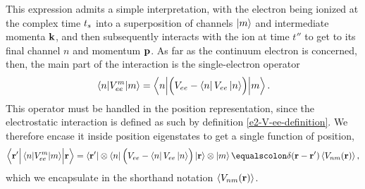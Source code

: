 This expression admits a simple interpretation, with the electron being ionized at the complex time ${t_s}$ into a superposition of channels $\ket{m}$ and intermediate momenta $\vb{k}$, and then subsequently interacts with the ion at time $t''$ to get to its final channel $n$ and momentum $\vb{p}$. As far as the continuum electron is concerned, then, the main part of the interaction is the single-electron operator
\begin{equation}
\matrixel{n}{V_{ee}^m}{m}
=
\matrixel**{n}{\left(\vphantom{\sum}V_{ee}-\bra{n}V_{ee}\ket{n}\right)}{m}.
\end{equation}
This operator must be handled in the position representation, since the electrostatic interaction is defined as such by definition \eqref{e2-V-ee-definition}. We therefore encase it inside position eigenstates to get a single function of position,
\begin{equation}
\matrixel**{\vbr'}{
\vphantom{\sum}
\matrixel{n}{V_{ee}^m}{m}
}{\vbr}
=
\bra{\vbr'}\otimes\bra{n}
{\left(\vphantom{\sum}V_{ee}-\bra{n}V_{ee}\ket{n}\right)}
\ket{\vbr}\otimes\ket{m}
\equalscolon
\delta(\vbr-\vbr')
\Vnm{\vbr},
\label{e2-Vnm-definition}
\end{equation}
which we encapsulate in the shorthand notation $\left\langle V_{nm}\mathopen{}\left( \vb{r} \right)\mathclose{} \right\rangle$.

